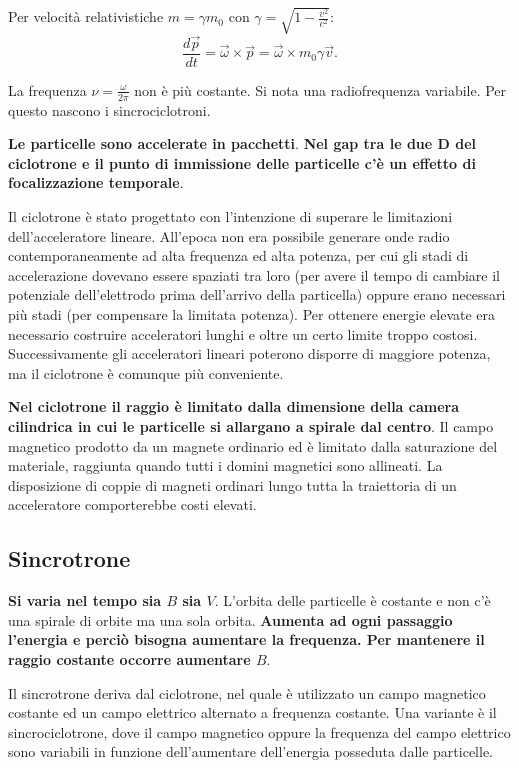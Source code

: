 \documentclass[a4paper,11pt,twoside,openany]{book}
\theoremstyle{definition}
\theoremstyle{plain}
\theoremstyle{plain}
\theoremstyle{definition}
\begin{document}
Per velocità relativistiche $m=\gamma m_0$ con $\gamma=\sqrt{1-\frac{v^2}{c^2}}$: $$\frac{d\vec p}{dt}=\vec\omega \times\vec p=\vec\omega \times m_0\gamma\vec v.$$

La frequenza $\nu=\frac{\omega }{2\pi}$ non è più costante. Si nota una radiofrequenza variabile. Per questo nascono i sincrociclotroni.

\textbf{Le particelle sono accelerate in pacchetti}. \textbf{Nel gap tra le due D del ciclotrone e il punto di immissione delle particelle c'è un effetto di focalizzazione temporale}.

Il ciclotrone è stato progettato con l'intenzione di superare le limitazioni dell'acceleratore lineare. All'epoca non era possibile generare onde radio contemporaneamente ad alta frequenza ed alta potenza, per cui gli stadi di accelerazione dovevano essere spaziati tra loro (per avere il tempo di cambiare il potenziale dell'elettrodo prima dell'arrivo della particella) oppure erano necessari più stadi (per compensare la limitata potenza). Per ottenere energie elevate era necessario costruire acceleratori lunghi e oltre un certo limite troppo costosi. Successivamente gli acceleratori lineari poterono disporre di maggiore potenza, ma il ciclotrone è comunque più conveniente.

\textbf{Nel ciclotrone il raggio è limitato dalla dimensione della camera cilindrica in cui le particelle si allargano a spirale dal centro}. Il campo magnetico prodotto da un magnete ordinario ed è limitato dalla saturazione del materiale, raggiunta quando tutti i domini magnetici sono allineati. La disposizione di coppie di magneti ordinari lungo tutta la traiettoria di un acceleratore comporterebbe costi elevati.

\subsection{Sincrotrone} %
\textbf{Si varia nel tempo sia $B$ sia $V$}. L'orbita delle particelle è costante e non c'è una spirale di orbite ma una sola orbita. \textbf{Aumenta ad ogni passaggio l'energia e perciò bisogna aumentare la frequenza. Per mantenere il raggio costante occorre aumentare $B$}.

Il sincrotrone deriva dal ciclotrone, nel quale è utilizzato un campo magnetico costante ed un campo elettrico alternato a frequenza costante. Una variante è il sincrociclotrone, dove il campo magnetico oppure la frequenza del campo elettrico sono variabili in funzione dell'aumentare dell'energia posseduta dalle particelle.
\end{document}

